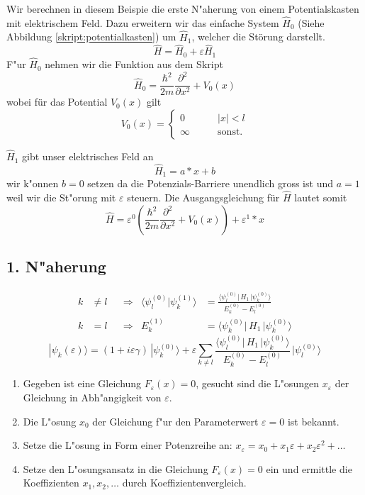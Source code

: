 \begin{refsection}
Wir berechnen in diesem Beispie die erste N"aherung von einem Potentialskasten mit elektrischem Feld.
Dazu erweitern wir das einfache System  $\hat H_0$
(Siehe Abbildung \ref{skript:potentialkasten})
um $\hat H_1$, welcher die Störung darstellt.
\[
  \hat{H} = \hat H_0 + \varepsilon \hat H_1
\]
F"ur $\hat H_0$ nehmen wir die Funktion aus dem Skript
\[
  \hat H_0 = \frac{\hbar^2}{2m} \frac{\partial^2}{\partial x^2} + V_0(x)
\]
wobei f\"ur das Potential $V_0(x)$ gilt
\[
  V_0(x)=\begin{cases}
    0       & \qquad |x|<l\\
    \infty  & \qquad\text{sonst.}
  \end{cases}
\]

$\hat H_1$ gibt unser elektrisches Feld an
\[
  \hat H_1 = a*x + b
\]
wir k"onnen $b = 0$ setzen da die Potenzials-Barriere unendlich gross ist und $a = 1$ weil wir die St"orung mit $\varepsilon$ steuern.
Die Ausgangsgleichung f\"ur $\hat{H}$ lautet somit
\[
  \hat{H} = \varepsilon^0 ( \frac{\hbar^2}{2m} \frac{\partial^2}{\partial x^2} + V_0(x) )
            + \varepsilon^1*x
\]


\subsection{ 1. N"aherung }


\begin{equation}
\begin{aligned}
k&\ne l
&&\Rightarrow&
\langle\psi_l^{(0)}|\psi_k^{(1)}\rangle
&=
\frac{\langle \psi_l^{(0)}|\, H_1 \,|\psi_k^{(0)}\rangle}{E_k^{(0)}-E_l^{(0)}}
\\
k&=l
&&\Rightarrow&
E_k^{(1)}
&=
\langle \psi_k^{(0)}|\, H_1 \,|\psi_k^{(0)}\rangle
\end{aligned}
\end{equation}
\begin{equation}
|\psi_k(\varepsilon)\rangle
=
(1+i\varepsilon \gamma)
\,|\psi_k^{(0)}\rangle
+
\varepsilon
\sum_{k\ne l}
\frac{\langle \psi_l^{(0)}|\, H_1 \,|\psi_k^{(0)}\rangle}{E_k^{(0)}-E_l^{(0)}}
\,
|\psi_l^{(0)}\rangle
\end{equation}

\begin{enumerate}
\item Gegeben ist eine Gleichung $F_\varepsilon(x)=0$, gesucht
sind die L"osungen $x_\varepsilon$ der Gleichung in Abh"angigkeit von
$\varepsilon$.
\item Die L"osung $x_0$ der Gleichung f"ur den Parameterwert $\varepsilon=0$
ist bekannt.
\item Setze die L"osung in Form einer Potenzreihe an:
$x_\varepsilon = x_0+x_1\varepsilon+x_2\varepsilon^2+\dots$
\item Setze den L"osungsansatz in die Gleichung $F_\varepsilon(x)=0$ ein
und ermittle die Koeffizienten $x_1,x_2,\dots$ durch Koeffizientenvergleich.
\end{enumerate}


\end{refsection}
